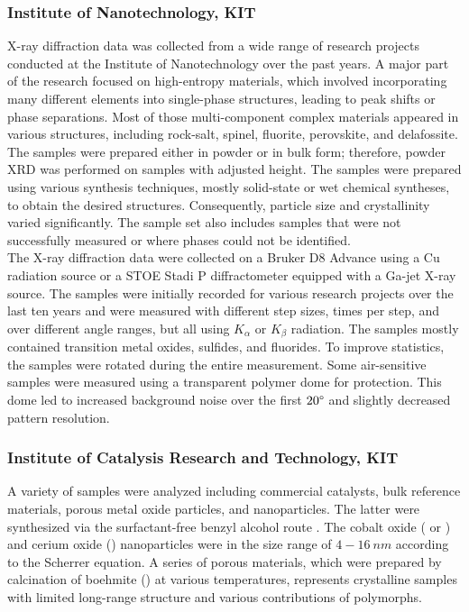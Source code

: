 \subsubsection*{Institute of Nanotechnology, KIT}

X-ray diffraction data was collected from a wide range of research projects conducted at the Institute of Nanotechnology over the past years. A major part of the research focused on high-entropy materials, which involved incorporating many different elements into single-phase structures, leading to peak shifts or phase separations. Most of those multi-component complex materials appeared in various structures, including rock-salt, spinel, fluorite, perovskite, and delafossite. The samples were prepared either in powder or in bulk form; therefore, powder XRD was performed on samples with adjusted height. The samples were prepared using various synthesis techniques, mostly solid-state or wet chemical syntheses, to obtain the desired structures. Consequently, particle size and crystallinity varied significantly. The sample set also includes samples that were not successfully measured or where phases could not be identified. \\

The X-ray diffraction data were collected on a Bruker D8 Advance using a Cu radiation source or a STOE Stadi P diffractometer equipped with a Ga-jet X-ray source. The samples were initially recorded for various research projects over the last ten years and were measured with different step sizes, times per step, and over different angle ranges, but all using  $K_\alpha$ or  $K_\beta$ radiation. The samples mostly contained transition metal oxides, sulfides, and fluorides. To improve statistics, the samples were rotated during the entire measurement. Some air-sensitive samples were measured using a transparent polymer dome for protection. This dome led to increased background noise over the first $20\degree$ and slightly decreased pattern resolution. \\ 

\subsubsection*{Institute of Catalysis Research and Technology, KIT}

A variety of samples were analyzed including commercial catalysts, bulk reference materials, porous metal oxide particles, and nanoparticles. The latter were synthesized via the surfactant-free benzyl alcohol route \cite{Wolf2019, Wolf2018}. The cobalt oxide ( or ) and cerium oxide () nanoparticles were in the size range of $4-16 \ \si{nm}$ according to the Scherrer equation. A series of porous  materials, which were prepared by calcination of boehmite () at various temperatures, represents crystalline samples with limited long-range structure and various contributions of  polymorphs. \\

